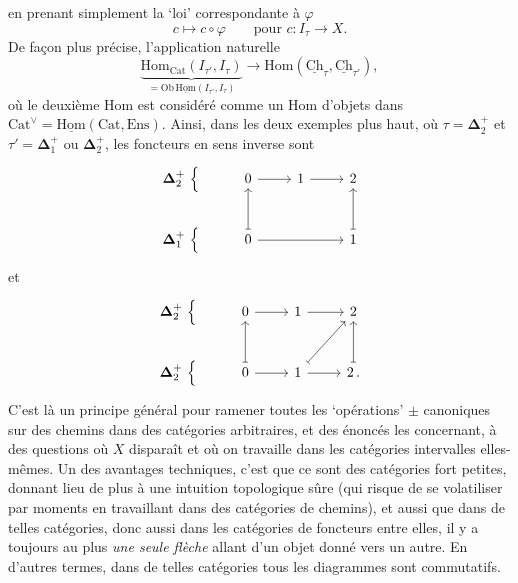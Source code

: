 \documentclass[11pt]{article}
\newcommand{\printedpage}[1]{\marginpar{\footnotesize p.~#1}}
\newcommand{\msp}[1]{\marginpar{\footnotesize [#1]}}
\newcommand{\bDelta}{\boldsymbol{\Delta}}
\newcommand{\Ch}{\underline{\mathrm{Ch}}}
\newcommand{\uHom}{\underline{\mathrm{Hom}}}
\newcommand{\Hom}{\mathrm{Hom}}
\newcommand{\Cat}{\mathrm{Cat}}
\begin{document}
\printedpage{14}

en prenant simplement la ‘loi’ correspondante à $\varphi$
\[
c \longmapsto c\circ\varphi \qquad \text{pour } c : I_\tau \longrightarrow X.
\]
De façon plus précise, l'application naturelle
\[
\underbrace{\Hom_{\Cat}(I_{\tau'},I_\tau)}_{=\mathrm{Ob}\,\uHom(I_{\tau'},I_\tau)} \longrightarrow \Hom(\Ch_\tau,\Ch_{\tau'}),
\]
\msp{page 22}
où le deuxième Hom est considéré comme un Hom d'objets dans $\Cat^{\vee}=\uHom(\Cat,\mathrm{Ens})$. Ainsi, dans les deux exemples plus haut, où $\tau=\bDelta_2^+$ et $\tau'=\bDelta_1^+$ ou $\bDelta_2^+$, les foncteurs en sens inverse sont
\[
\begin{tikzcd}
\bDelta_2^+\ \Big\{ & 0 \arrow[r] & 1 \arrow[r] & 2 \\
\bDelta_1^+\ \Big\{ & 0 \arrow[u, mapsto] \arrow[rr] & & 1 \arrow[u, mapsto]
\end{tikzcd}
\]
et
\[
\begin{tikzcd}
\bDelta_2^+\ \Big\{ & 0 \arrow[r] & 1 \arrow[r] & 2 \\
\bDelta_2^+\ \Big\{ & 0 \arrow[u, mapsto] \arrow[r] & 1 \arrow[ur, mapsto] \arrow[r] & 2\,. \arrow[u, mapsto]
\end{tikzcd}
\]
C'est là un principe général pour ramener toutes les ‘opérations’ $\pm$ canoniques sur des chemins dans des catégories arbitraires, et des énoncés les concernant, à des questions où $X$ disparaît et où on travaille dans les catégories intervalles elles-mêmes. Un des avantages techniques, c'est que ce sont des catégories fort petites, donnant lieu de plus à une intuition topologique sûre (qui risque de se volatiliser par moments en travaillant dans des catégories de chemins), et aussi que dans de telles catégories, donc aussi dans les catégories de foncteurs entre elles, il y a toujours au plus
\msp{page 23}
\textit{une seule flèche} allant d'un objet donné vers un autre. En d'autres termes, dans de telles catégories tous les diagrammes sont commutatifs.
\end{document}
